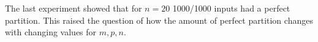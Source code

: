 The last experiment showed that for $n=20$ 1000/1000 inputs had a perfect partition. This raised the question of how the amount of perfect partition changes with changing values for $m, p, n$.




